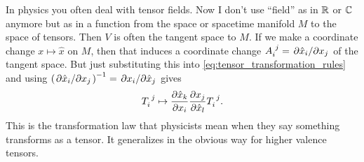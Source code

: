 \documentclass[english, 12pt]{article}
\begin{document}
In physics you often deal with tensor fields.
Now I don't use \enquote{field} as in $\mathbb{R}$ or $\mathbb{C}$ anymore but as in a function from the space or spacetime manifold $M$ to the space of tensors.
Then $V$ is often the tangent space to $M$.
If we make a coordinate change $x \mapsto \hat x$ on $M$, then that induces a coordinate change $\tensor{A}{_i^j} = \pdv*{\hat x_i}{x_j}$ of the tangent space.
But just substituting this into \cref{eq:tensor_transformation_rules} and using $\left(\pdv*{\hat x_i}{x_j}\right)^{-1} = \pdv*{x_i}{\hat x_j} $ gives
\begin{align*}
	\tensor{T}{_i^j} \mapsto \pdv{\hat x_k}{x_i} \pdv{x_j}{\hat x_l} \tensor{T}{_i^j}.
\end{align*}
This is the transformation law that physicists mean when they say something transforms as a tensor.
It generalizes in the obvious way for higher valence tensors.
\end{document}
